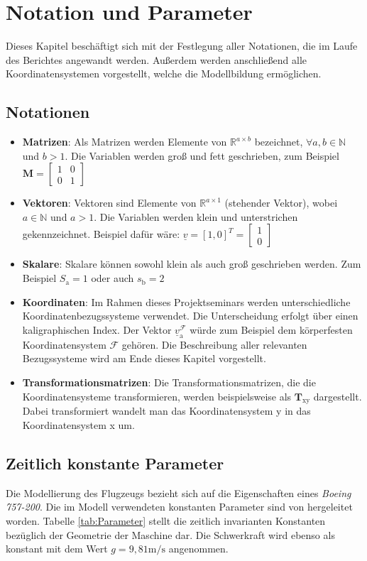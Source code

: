 \chapter{Notation und Parameter}\label{cha:Notation}

Dieses Kapitel beschäftigt sich mit der Festlegung aller Notationen, die im Laufe des Berichtes angewandt werden. Außerdem werden anschließend alle Koordinatensystemen vorgestellt, welche die Modellbildung ermöglichen.

\section{Notationen}
\begin{itemize}
\item \textbf{Matrizen}: Als Matrizen werden Elemente von $\mathbb{R}^{a\times b}$ bezeichnet, $\forall a,b \in \mathbb{N}$ und $b>1$. Die Variablen werden groß und fett geschrieben, zum Beispiel $\textbf{M} = \begin{bmatrix} 
1 & 0\\
0 & 1
\end{bmatrix}$
\item \textbf{Vektoren}: Vektoren sind Elemente von $\mathbb{R}^{a\times 1}$ (stehender Vektor), wobei $a \in \mathbb{N}$ und $a>1$. Die Variablen werden klein und unterstrichen gekennzeichnet. Beispiel dafür wäre: $\underline{v} = [1,0]^T = \begin{bmatrix} 
1 \\
0 
\end{bmatrix}$
\item \textbf{Skalare}: Skalare können sowohl klein als auch groß geschrieben werden. Zum Beispiel $S_\mathrm{a} = 1$ oder auch $s_\mathrm{b} = 2$
\item \textbf{Koordinaten}: Im Rahmen dieses Projektseminars werden unterschiedliche Koordinatenbezugssysteme verwendet. Die Unterscheidung erfolgt über einen kaligraphischen Index. Der Vektor $\underline{v}_\mathrm{a}^\mathcal{F}$ würde zum Beispiel dem körperfesten Koordinatensystem $\mathcal{F}$ gehören. Die Beschreibung aller relevanten Bezugssysteme wird am Ende dieses Kapitel vorgestellt.
\item \textbf{Transformationsmatrizen}: Die Transformationsmatrizen, die die Koordinatensysteme transformieren, werden beispielsweise als $\textbf{T}_\mathrm{xy}$  dargestellt. Dabei transformiert wandelt man das Koordinatensystem y in das Koordinatensystem x um.
\end{itemize}
\section{Zeitlich konstante Parameter}
Die Modellierung des Flugzeugs bezieht sich auf die Eigenschaften eines \textit{Boeing 757-200}. Die im Modell verwendeten konstanten Parameter sind von \cite{B7571, B7572,RAMPaper} hergeleitet worden. Tabelle \ref{tab:Parameter} stellt die zeitlich invarianten Konstanten bezüglich der Geometrie der Maschine dar. Die Schwerkraft wird ebenso als konstant mit dem Wert $g = 9,81 \mathrm{m/s}$ angenommen.

